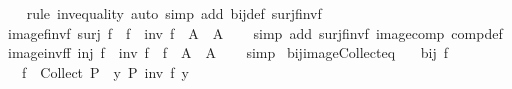 \begin{isabellebody}
%
\isadelimproof
\ \ %
\endisadelimproof
%
\isatagproof
{}\isamarkupfalse%
\ {\isacharparenleft}{\kern0pt}rule\ inv{\isacharunderscore}{\kern0pt}equality{\isacharparenright}{\kern0pt}\ {\isacharparenleft}{\kern0pt}auto\ simp\ add{\isacharcolon}{\kern0pt}\ bij{\isacharunderscore}{\kern0pt}def\ surj{\isacharunderscore}{\kern0pt}f{\isacharunderscore}{\kern0pt}inv{\isacharunderscore}{\kern0pt}f{\isacharparenright}{\kern0pt}%
\endisatagproof
{\isafoldproof}%
%
\isadelimproof
\isanewline
%
\endisadelimproof
\isanewline
{}\isamarkupfalse%
\ image{\isacharunderscore}{\kern0pt}f{\isacharunderscore}{\kern0pt}inv{\isacharunderscore}{\kern0pt}f{\isacharcolon}{\kern0pt}\ {\isachardoublequoteopen}surj\ f\ {\isasymLongrightarrow}\ f\ {\isacharbackquote}{\kern0pt}\ {\isacharparenleft}{\kern0pt}inv\ f\ {\isacharbackquote}{\kern0pt}\ A{\isacharparenright}{\kern0pt}\ {\isacharequal}{\kern0pt}\ A{\isachardoublequoteclose}\isanewline
%
\isadelimproof
\ \ %
\endisadelimproof
%
\isatagproof
{}\isamarkupfalse%
\ {\isacharparenleft}{\kern0pt}simp\ add{\isacharcolon}{\kern0pt}\ surj{\isacharunderscore}{\kern0pt}f{\isacharunderscore}{\kern0pt}inv{\isacharunderscore}{\kern0pt}f\ image{\isacharunderscore}{\kern0pt}comp\ comp{\isacharunderscore}{\kern0pt}def{\isacharparenright}{\kern0pt}%
\endisatagproof
{\isafoldproof}%
%
\isadelimproof
\isanewline
%
\endisadelimproof
\isanewline
{}\isamarkupfalse%
\ image{\isacharunderscore}{\kern0pt}inv{\isacharunderscore}{\kern0pt}f{\isacharunderscore}{\kern0pt}f{\isacharcolon}{\kern0pt}\ {\isachardoublequoteopen}inj\ f\ {\isasymLongrightarrow}\ inv\ f\ {\isacharbackquote}{\kern0pt}\ {\isacharparenleft}{\kern0pt}f\ {\isacharbackquote}{\kern0pt}\ A{\isacharparenright}{\kern0pt}\ {\isacharequal}{\kern0pt}\ A{\isachardoublequoteclose}\isanewline
%
\isadelimproof
\ \ %
\endisadelimproof
%
\isatagproof
{}\isamarkupfalse%
\ simp%
\endisatagproof
{\isafoldproof}%
%
\isadelimproof
\isanewline
%
\endisadelimproof
\isanewline
{}\isamarkupfalse%
\ bij{\isacharunderscore}{\kern0pt}image{\isacharunderscore}{\kern0pt}Collect{\isacharunderscore}{\kern0pt}eq{\isacharcolon}{\kern0pt}\isanewline
\ \ \ {\isachardoublequoteopen}bij\ f{\isachardoublequoteclose}\isanewline
\ \ \ {\isachardoublequoteopen}f\ {\isacharbackquote}{\kern0pt}\ Collect\ P\ {\isacharequal}{\kern0pt}\ {\isacharbraceleft}{\kern0pt}y{\isachardot}{\kern0pt}\ P\ {\isacharparenleft}{\kern0pt}inv\ f\ y{\isacharparenright}{\kern0pt}{\isacharbraceright}{\kern0pt}{\isachardoublequoteclose}\isanewline

\end{isabellebody}
